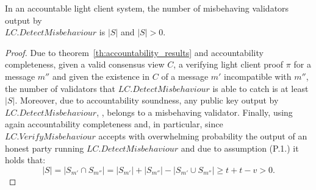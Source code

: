 \begin{corollary} In an accountable light client system, the number of misbehaving validators output by \\ 
$\mathit{LC.DetectMisbehaviour}$ is $|S|$ and $|S| > 0$.
\end{corollary}
\begin{proof} Due to theorem~\ref{th:accountability_results} and accountability completeness, 
given a valid consensus view $C$, a verifying light client proof $\pi$ for a message $m''$ 
and given the existence in $C$ of a message $m'$ incompatible with $m''$, the number of 
validators that $\mathit{LC.DetectMisbehaviour}$ is able to catch is at least $|S|$. Moreover, due 
to accountability soundness, any public key output by $\mathit{LC.DetectMisbehaviour}$, \ewnp, belongs to a misbehaving validator. 
Finally, using again accountability completeness and, in particular, since $\mathit{LC.VerifyMisbehaviour}$ accepts 
with overwhelming probability the output of an honest party running $\mathit{LC.DetectMisbehaviour}$ and due to assumption (P.1.) it holds that:
$$ |S| = |S_{m'} \cap S_{m''}| = |S_{m'}| + |S_{m''}| - |S_{m'} \cup S_{m''}| \geq t + t - v > 0.$$ 
\end{proof}
